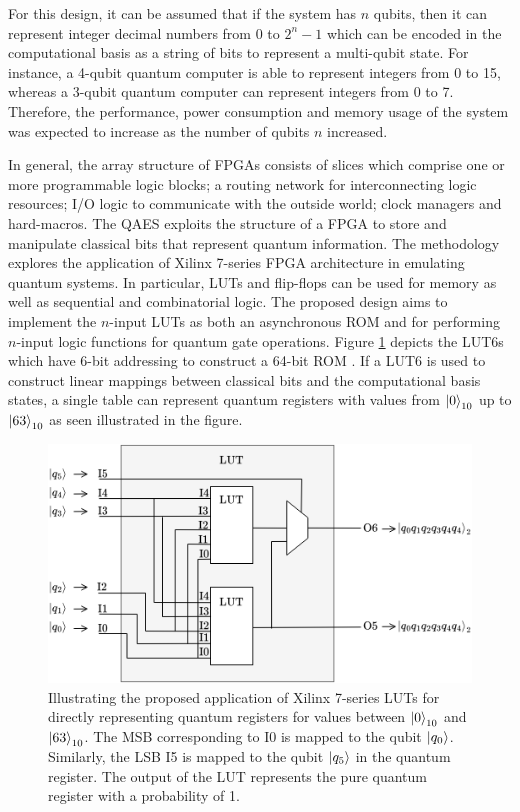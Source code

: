 For this design, it can be assumed that if the system has $n$ qubits, then it can represent integer decimal numbers from 0 to $2^n-1$ which can be encoded in the computational basis as a string of bits to represent a multi-qubit state. For instance, a 4-qubit quantum computer is able to represent integers from 0 to 15, whereas a $3$-qubit quantum computer can represent integers from 0 to 7. Therefore, the performance, power consumption and memory usage of the system was expected to increase as the number of qubits $n$ increased. 

In general, the array structure of FPGAs consists of slices which comprise one or more programmable logic blocks; a routing network for interconnecting logic resources; I/O logic to communicate with the outside world; clock managers and hard-macros. The QAES exploits the structure of a FPGA to store and manipulate classical bits that represent quantum information. The methodology explores the application of Xilinx 7-series FPGA architecture in emulating quantum systems. In particular, LUTs and flip-flops can be used for memory as well as sequential and combinatorial logic. The proposed design aims to implement the $n$-input LUTs as both an asynchronous ROM and for performing $n$-input logic functions for quantum gate operations. Figure \ref{fig:amd-lut6} depicts the LUT6s which have 6-bit addressing to construct a 64-bit ROM \cite{amd2024support}. If a LUT6 is used to construct linear mappings between classical bits and the computational basis states, a single table can represent quantum registers with values from $\ket{0}_{10}$ up to $\ket{63}_{10}$ as seen illustrated in the figure. 
\begin{figure}[!ht]
	\centering
	\includegraphics[width=0.85\linewidth]{body/ch4/figs/amd-lut6}
	\caption[Direct Mapping of Computational Basis States to Xilinx FPGA LUTs.]{Illustrating the proposed application of Xilinx 7-series LUTs for directly representing quantum registers for values between $\ket{0}_{10}$ and $\ket{63}_{10}$. The MSB corresponding to I0 is mapped to the qubit $\ket{q_0}$. Similarly, the LSB I5 is mapped to the qubit $\ket{q_5}$ in the quantum register. The output of the LUT represents the pure quantum register with a probability of 1.}
	\label{fig:amd-lut6}
\end{figure}

